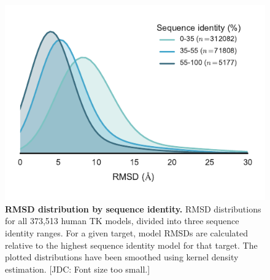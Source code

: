 \documentclass[aps,pre,twocolumn,nofootinbib,superscriptaddress,linenumbers]{revtex4-1}
\begin{document}
\begin{figure}[tb]
    \includegraphics[width=1.0\columnwidth]{rmsddist/rmsddist2}

    \caption{{\bf RMSD distribution by sequence identity.}
    RMSD distributions for all 373,513 human TK models, divided into three sequence identity ranges.
    For a given target, model RMSDs are calculated relative to the highest sequence identity model for that target.
    The plotted distributions have been smoothed using kernel density estimation.
    {\color{red}[JDC: Font size too small.]}
  }
  \label{figure:rmsd-distribution-by-sequence-identity}
\end{figure}

\end{document}
